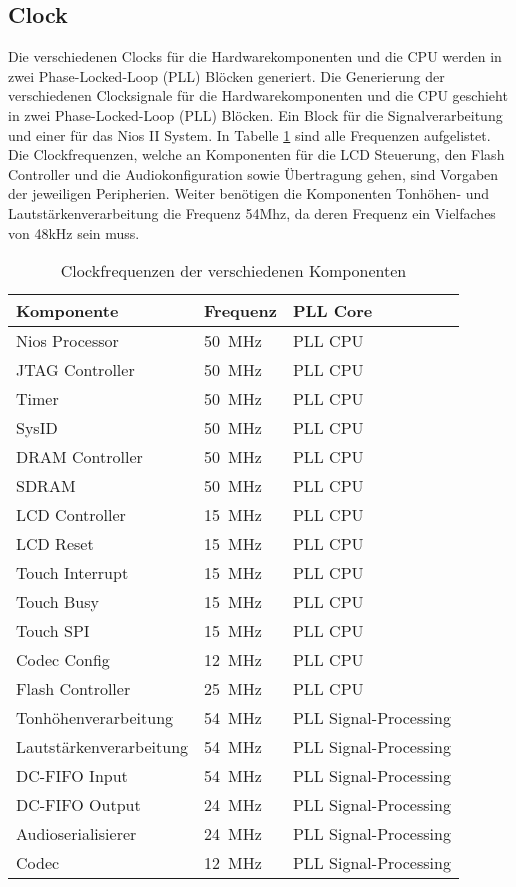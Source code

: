 \subsection{Clock}\label{subsec:Clock}
Die verschiedenen Clocks für die Hardwarekomponenten und die CPU werden in zwei Phase-Locked-Loop (PLL) Blöcken generiert. Die Generierung der verschiedenen Clocksignale für die Hardwarekomponenten und die CPU geschieht in zwei Phase-Locked-Loop (PLL) Blöcken. Ein Block für die Signalverarbeitung und einer für das Nios II System. In Tabelle \ref{tab:clocks} sind alle Frequenzen aufgelistet. \\
Die Clockfrequenzen, welche an Komponenten für die LCD Steuerung, den Flash Controller und die Audiokonfiguration sowie Übertragung gehen, sind Vorgaben der jeweiligen Peripherien. Weiter benötigen die Komponenten Tonhöhen- und Lautstärkenverarbeitung die Frequenz 54Mhz, da deren Frequenz ein Vielfaches von 48kHz sein muss.

\begin{table}[H]
	\centering
	\caption{Clockfrequenzen der verschiedenen Komponenten}
	\label{tab:clocks}
	\begin{tabular}{l|l|l}
		\textbf{Komponente} & \textbf{Frequenz} & \textbf{PLL Core} \\
		\hline\hline
		Nios Processor & \SI{50}{MHz} & PLL CPU  \\ \hline
		JTAG Controller & \SI{50}{MHz} & PLL CPU \\ \hline
		Timer & \SI{50}{MHz} & PLL CPU \\ \hline
		SysID & \SI{50}{MHz} & PLL CPU \\ \hline
		DRAM Controller & \SI{50}{MHz} & PLL CPU \\ \hline
		SDRAM & \SI{50}{MHz} & PLL CPU \\ \hline
		LCD Controller & \SI{15}{MHz} & PLL CPU \\ \hline
		LCD Reset & \SI{15}{MHz} & PLL CPU \\ \hline
		Touch Interrupt & \SI{15}{MHz} & PLL CPU \\ \hline
		Touch Busy & \SI{15}{MHz} & PLL CPU \\ \hline
		Touch SPI & \SI{15}{MHz} & PLL CPU \\ \hline
		Codec Config & \SI{12}{MHz} & PLL CPU \\ \hline
		Flash Controller & \SI{25}{MHz} & PLL CPU \\ \hline
		Tonhöhenverarbeitung & \SI{54}{MHz} & PLL Signal-Processing \\ \hline
		Lautstärkenverarbeitung & \SI{54}{MHz} & PLL Signal-Processing \\ \hline
		DC-FIFO Input	& \SI{54}{MHz} & PLL Signal-Processing \\ \hline
		DC-FIFO Output	& \SI{24}{MHz} & PLL Signal-Processing \\ \hline
	 	Audioserialisierer	& \SI{24}{MHz} & PLL Signal-Processing \\ \hline
	 	Codec	& \SI{12}{MHz} & PLL Signal-Processing \\ \hline
		
	\end{tabular}
\end{table}
